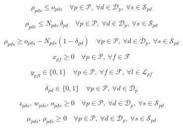 \documentclass{article}
\begin{document}
\begin{equation}
\rho_{pds} \le o_{pds}
\quad \forall p \in \mathcal{P},\ \forall d \in \mathcal{D}_p,\ \forall s \in \mathcal{S}_{pd}
\tag{22q}
\end{equation}

\begin{equation}
\rho_{pds} \le N_{pds}\, \delta_{pd}
\quad \forall p \in \mathcal{P},\ \forall d \in \mathcal{D}_p,\ \forall s \in \mathcal{S}_{pd}
\tag{22r}
\end{equation}

\begin{equation}
\rho_{pds} \ge o_{pds} - N_{pds}(1 - \delta_{pd})
\quad \forall p \in \mathcal{P},\ \forall d \in \mathcal{D}_p,\ \forall s \in \mathcal{S}_{pd}
\tag{22s}
\end{equation}

\begin{equation}
x_{pf} \ge 0
\quad \forall p \in \mathcal{P},\ \forall f \in \mathcal{F}
\tag{22j}
\end{equation}

\begin{equation}
y_{pfl} \in \{0,1\}
\quad \forall p \in \mathcal{P},\ \forall f \in \mathcal{F},\ \forall l \in \mathcal{L}_{pf}
\tag{22k}
\end{equation}

\begin{equation}
\delta_{pd} \in \{0,1\}
\quad \forall p \in \mathcal{P},\ \forall d \in \mathcal{D}_p
\tag{22l}
\end{equation}

\begin{equation}
z_{pds},\, w_{pds},\, o_{pds} \ge 0
\quad \forall p \in \mathcal{P},\ \forall d \in \mathcal{D}_p,\ \forall s \in \mathcal{S}_{pd}
\tag{22m}
\end{equation}

\begin{equation}
\mu_{pds},\, \rho_{pds} \ge 0
\quad \forall p \in \mathcal{P},\ \forall d \in \mathcal{D}_p,\ \forall s \in \mathcal{S}_{pd}
\tag{Lin-Dom}
\end{equation}
\end{document}

